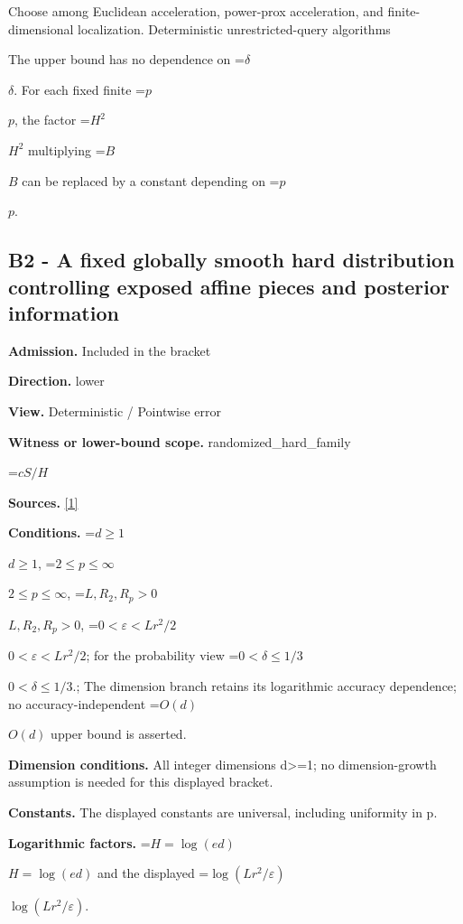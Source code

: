 \documentclass[10pt,a4paper]{article}
\newcommand{\AtlasMath}[1]{\par\begingroup\centering\setbox0=\hbox{$\displaystyle #1$}\ifdim\wd0>1.4\linewidth\typeout{ATLAS WIDE FORMULA: \the\wd0}\fi\ifdim\wd0>\linewidth\resizebox{\linewidth}{!}{\box0}\else\box0\fi\par\endgroup}
\newcommand{\AtlasInlineMath}[1]{\begingroup\setbox0=\hbox{$#1$}\ifdim\wd0>.4\linewidth\endgroup\AtlasMath{#1}\else\endgroup$#1$\fi}
\begin{document}
Choose among Euclidean acceleration, power-prox acceleration, and finite-dimensional localization. Deterministic unrestricted-query algorithms



The upper bound has no dependence on \AtlasInlineMath{\delta}. For each fixed finite \AtlasInlineMath{p}, the factor \AtlasInlineMath{H^2} multiplying \AtlasInlineMath{B} can be replaced by a constant depending on \AtlasInlineMath{p}.



\subsection{B2 - A fixed globally smooth hard distribution controlling exposed affine pieces and posterior information}


\textbf{Admission.} Included in the bracket



\textbf{Direction.} lower



\textbf{View.} Deterministic / Pointwise error



\textbf{Witness or lower-bound scope.} randomized\_hard\_family



\AtlasMath{cS/H}


\textbf{Sources.} \href{https://github.com/WU-Wendao/Colombo/blob/main/colombo_sensorium/Complexity_altas/data/sources/colombo/U02/manuscript.pdf}{[1]}



\textbf{Conditions.} \AtlasInlineMath{d\ge1}, \AtlasInlineMath{2\le p\le\infty}, \AtlasInlineMath{L,R_2,R_p>0}, \AtlasInlineMath{0<\varepsilon<Lr^2/2}; for the probability view \AtlasInlineMath{0<\delta\le1/3}.; The dimension branch retains its logarithmic accuracy dependence; no accuracy-independent \AtlasInlineMath{O(d)} upper bound is asserted.



\textbf{Dimension conditions.} All integer dimensions d>=1; no dimension-growth assumption is needed for this displayed bracket.



\textbf{Constants.} The displayed constants are universal, including uniformity in p.



\textbf{Logarithmic factors.} \AtlasInlineMath{H=\log(ed)} and the displayed \AtlasInlineMath{\log(Lr^2/\varepsilon)}.
\end{document}
